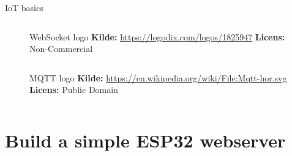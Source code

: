 \documentclass[aspectratio=169]{beamer}
\begin{document}
\begin{frame}{IoT basics}
\begin{columns}
\begin{column}{0.4\textwidth}
\begin{columns}
\begin{column}{0.45\textwidth}
				\begin{figure}[height=0.2\textheight]
  					
  					\caption{WebSocket logo
  					\captionline \textbf{Kilde:} \url{https://logodix.com/logos/1825947}
  					\captionline \textbf{Licens:} Non-Commercial}
  					\label{fig:websocket-logo}
				\end{figure}
			\end{column}
		\end{columns}
		\begin{columns}
			\begin{column}{0.45\textwidth}
				\begin{figure}[height=0.2\textheight]
  					
  					\caption{MQTT logo
  					\captionline \textbf{Kilde:} \url{https://en.wikipedia.org/wiki/File:Mqtt-hor.svg}
  					\captionline \textbf{Licens:} Public Domain}
  					\label{fig:mqtt-logo}
				\end{figure}
			\end{column}
		\end{columns}
	\end{column}
\end{columns}
\end{frame}

\section{Build a simple ESP32 webserver}
\begin{frame}
\end{frame}
\end{document}

